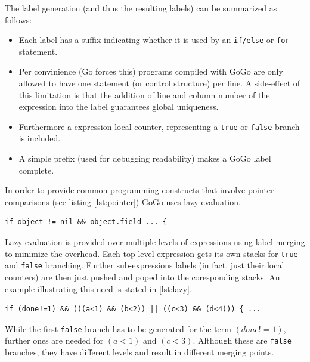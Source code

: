 \documentclass[a4paper]{scrartcl}
\begin{document}
      The label generation (and thus the resulting labels) can be summarized as 
      follows:
      \begin{itemize}
        \item Each label has a suffix indicating whether it is used by an 
          \texttt{if/else} or \texttt{for} statement.
        \item Per convinience (Go forces this) programs compiled with GoGo
          are only allowed to have one statement (or control structure) per 
          line. A side-effect of this limitation is that the addition of line
          and column number of the expression into the label guarantees global
          uniqueness.
        \item Furthermore a expression local counter, representing a \texttt{true} 
          or \texttt{false} branch is included.
        \item A simple prefix (used for debugging readability) makes a GoGo
          label complete.
      \end{itemize}

      In order to provide common programming constructs that involve pointer 
      comparisons (see listing \ref{lst:pointer}) GoGo uses lazy-evaluation.

      \begin{lstlisting}[label=lst:pointer,caption=Pointer comparison]
if object != nil && object.field ... {
      \end{lstlisting}

      Lazy-evaluation is provided over multiple levels of expressions using
      label merging to minimize the overhead. Each top level expression gets 
      its own stacks for \texttt{true} and \texttt{false} branching. Further 
      sub-expressions labels (in fact, just their local counters) are then just 
      pushed and poped into the coresponding stacks. An example illustrating 
      this need is stated in \ref{lst:lazy}.
      \begin{lstlisting}[caption=Lazy-evaluation over multiple expression levels, label=lst:lazy]
if (done!=1) && (((a<1) && (b<2)) || ((c<3) && (d<4))) { ...
      \end{lstlisting}
      While the first \texttt{false} branch has to be generated for the term
      $(done!=1)$, further ones are needed for $(a<1)$ and $(c<3)$. Although these are
      \texttt{false} branches, they have different levels and result in different
      merging points.
\end{document}

